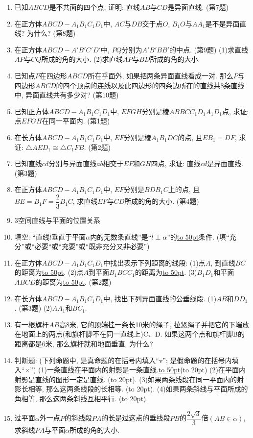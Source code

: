 \documentclass[10pt,a4paper]{article}
\newcommand{\blank}[1]{\underline{\hbox to #1pt{}}}
\newcommand{\bracket}[1]{(\hbox to #1pt{})}
\begin{document}
\begin{enumerate}[1.]
(第6题)
\item 已知$ABCD$是不共面的四个点, 证明: 直线$AB$与$CD$是异面直线.
(第7题)
\item 在正方体$ABCD-A_1B_1C_1D_1$中, $AC$与$DB$交于点$O$, $B_1O$与$AA_1$是不是异面直线? 为什么?
(第8题)
\item 在正方体$ABCD-A'B'C'D'$中, $PQ$分别为$A'B'BB'$的中点.
(第9题)
(1)求直线$AP$与$CQ$所成的角的大小.
(2)求直线$AP$与$BD$所成的角的大小.
\item 已知点$P$在四边形$ABCD$所在乎面外, 如果把两条异面直线看成一对. 那么$P$与四边形$ABCD$的四个顶点的连线以及此四边形的四条边所在的直线共8条直线中, 异面直线共有多少对?
(第10题)
\item 已知正方体$ABCD-A_1B_1C_1D_1$中, $EFGH$分别是棱$ABBCC_1D_1A_1D_1$点, 求证: 点$EFGH$在同一平面内.
(第1题)
\item 在长方体$ABCD-A_1B_1C_1D_1$中, $EF$分别是棱$A_1B_1DC$的点, 且$EB_1=DF$, 求证: $\triangle AED_1\cong \triangle C_1FB$.
(第2题)
\item 已知直线$cd$分别与异面直线$ab$相交于$EF$和$GH$四点, 求证: 直线$cd$是异面直线.
(第3题)
\item 在正方体$ABCD-A_1B_1C_1D_1$中, $EF$分别是$BDB_1C$上的点, 且$BE=B_1F=\dfrac 23B_1C$, 求直线$EF$与$CD$所成的角的大小.
(第4题)
\item 3空间直线与平面的位置关系
\item 填空:
``直线$l$垂直于平面$\alpha$内的无数条直线''是``$l\perp \alpha$''的\blank{50}条件. (填``充分''或``必要``或``充要''或``既非充分又非必要'')
\item 在正方体$ABCD-A_1B_1C_1D_1$中找出表示下列距离的线段:
(1)点$A$, 到直线$BC$的距离为\blank{50}.
(2)点$A$到平面$B_1BCC_1$的距离为\blank{50}.
(3)$B_1D_1$和平面$ABCD$的距离为\blank{50}.
(第2题)
\item 在长方体$ABCD-A_1B_1C_1D_1$中, 找出下列异面直线的公垂线段.
(1)$AB$和$DD_1$.
(第3题)
(2)$AA_1$和$BC_1$.
\item 有一根旗杆$AB$高8米, 它的顶端挂一条长10米的绳子, 拉紧绳子并把它的下端放在地面上的两点(和旗杆脚不在同一直线上)C、D. 如果这两个点和旗杆脚B的距离都是6米, 那么旗杆就和地面垂直, 为什么?
\item 判断题: (下列命题中, 是真命题的在括号内填入``v''; 是假命题的在括号内填入``×'')
(1)一条直线在平面内的射影是一条直线.\blank{50}\bracket{20}
(2)在平面内射影是直线的图形一定是直线.   \bracket{20}.
(3)如果两条线段在同一平面内的射影长相等, 那么这两条线段的长相等. \bracket{20}.
(4)如果两条斜线与平面所成的角相等, 那么这两条斜线互相平行. \bracket{20}.
\item 过平面$\alpha$外一点$P$的斜线段$PA$的长是过这点的垂线段$PB$的$\dfrac{2\sqrt 3}3$倍$(AB\in \alpha)$, 求斜线$PA$与平面$\alpha$所成的角的大小.

\end{enumerate}
\end{document}
